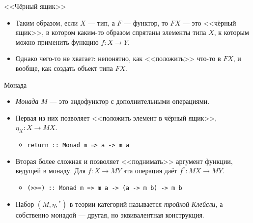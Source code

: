 \documentclass[xcolor=dvipsnames]{beamer}
\begin{document}
\begin{frame}{<<Чёрный ящик>>}

\begin{itemize}[<+->]
\item Таким образом, если $X$ --- тип, а $F$ --- функтор, то $FX$ --- это <<чёрный ящик>>, в котором каким-то образом спрятаны элементы типа $X$, к которым можно применить функцию $f \colon X \to Y$.
\begin{center}
\end{center}
\item Однако чего-то не хватает: непонятно, как <<положить>> что-то в $FX$, и вообще, как создать объект типа $FX$.
\end{itemize}
 
 
\end{frame}



\begin{frame}{Монада}
 
 \begin{itemize}[<+->]
  \item {\em Монада} $M$ --- это эндофунктор с дополнительными операциями.
  \item Первая из них позволяет <<положить элемент в чёрный ящик>>, $\eta_X \colon X \to M X$.
  \begin{itemize}
  \item \texttt{return :: Monad m => a -> m a}
  \end{itemize}
  \item Вторая более сложная и позволяет <<поднимать>> аргумент функции, ведущей в монаду. Для $f \colon X \to M Y$ эта операция даёт $f^* \colon M X \to M Y$.
  \begin{itemize}
  \item \texttt{(>>=) :: Monad m => m a -> (a -> m b) -> m b}
  \end{itemize}
  \item Набор $(M, \eta, {}^*)$ в теории категорий называется {\em тройкой Клейсли,} а собственно монадой --- другая, но эквивалентная конструкция.
 \end{itemize}
\end{frame}
\end{document}
